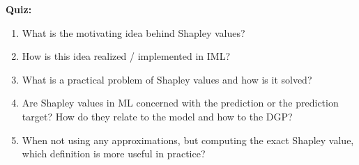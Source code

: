 \textbf{Quiz:}
\begin{enumerate}
    \item What is the motivating idea behind Shapley values? 
    \item How is this idea realized / implemented in IML?
    \item What is a practical problem of Shapley values and how is it solved?
    \item Are Shapley values in ML concerned with the prediction or the prediction target? How do they relate to the model and how to the DGP?
    \item When not using any approximations, but computing the exact Shapley value, which definition is more useful in practice?
\end{enumerate}
